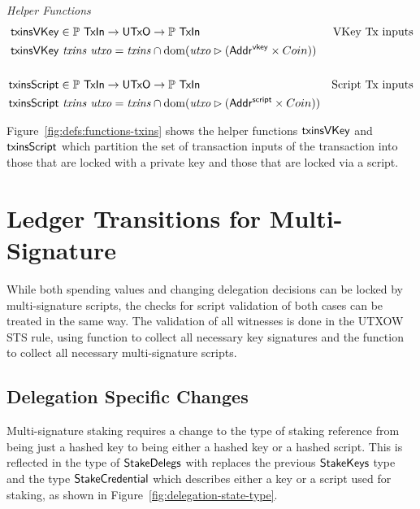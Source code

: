\documentclass[11pt,a4paper,dvipsnames]{article}
\newcommand{\AddrVKey}{\type{Addr^{vkey}}}
\newcommand{\UTxO}{\type{UTxO}}
\newcommand{\StakeDelegs}{\type{StakeDelegs}}
\newcommand{\StakeObject}{\type{StakeCredential}}
\newcommand{\AddrScr}{\type{Addr^{script}}}
\newcommand{\TxIn}{\type{TxIn}}
\theoremstyle{definition}
\begin{document}
\begin{figure*}[htb]
  \emph{Helper Functions}
  \begin{align*}
    \fun{txinsVKey} & \in \powerset \TxIn \to \UTxO \to \powerset\TxIn & \text{VKey Tx inputs}\\
    \fun{txinsVKey} & ~\var{txins}~\var{utxo} =
    \var{txins} \cap \dom (\var{utxo} \restrictrange (\AddrVKey \times Coin))
    \\
    \\
    \fun{txinsScript} & \in \powerset \TxIn \to \UTxO \to \powerset\TxIn & \text{Script Tx inputs}\\
    \fun{txinsScript} & ~\var{txins}~\var{utxo} =
                        \var{txins} \cap \dom (\var{utxo} \restrictrange (\AddrScr \times Coin))
  \end{align*}
  \caption{Helper Functions for Transaction Inputs}
  \label{fig:defs:functions-txins}
\end{figure*}

Figure~\ref{fig:defs:functions-txins} shows the helper functions
$\mathsf{txinsVKey}$ and $\mathsf{txinsScript}$ which partition the set of transaction
inputs of the transaction into those that are locked with a private key and
those that are locked via a script.

\section{Ledger Transitions for Multi-Signature}
\label{sec:ledg-trans-multi}

While both spending values and changing delegation decisions can be locked by
multi-signature scripts, the checks for script validation of both cases can be
treated in the same way. The validation of all witnesses is done in the UTXOW
STS rule, using function  to collect all necessary key
signatures and the function  to collect all necessary
multi-signature scripts.

\subsection{Delegation Specific Changes}
\label{sec:deleg-trans-rules}

Multi-signature staking requires a change to the type of staking reference from
being just a hashed key to being either a hashed key or a hashed script. This is
reflected in the type of $\StakeDelegs$ with replaces the previous
$\mathsf{StakeKeys}$ type and the type $\StakeObject$ which describes either a key
or a script used for staking, as shown in
Figure~\ref{fig:delegation-state-type}.
\end{document}

